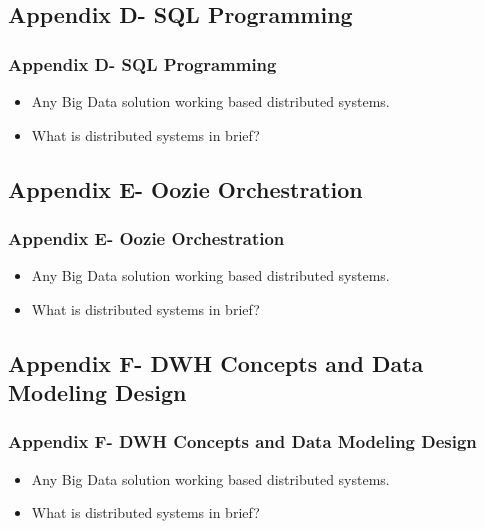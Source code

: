 
\subsection{Appendix D- SQL Programming}
\begin{frame}
\frametitle{Appendix D- SQL Programming}
\begin{itemize}[<+->]
	\item Any Big Data solution working based distributed systems.
	\item What is distributed systems in brief?
\end{itemize}
\end{frame}


\subsection{Appendix E- Oozie Orchestration}
\begin{frame}
\frametitle{Appendix E- Oozie Orchestration}
\begin{itemize}[<+->]
	\item Any Big Data solution working based distributed systems.
	\item What is distributed systems in brief?
\end{itemize}
\end{frame}


\subsection{Appendix F- DWH Concepts and Data Modeling Design}
\begin{frame}
\frametitle{Appendix F- DWH Concepts and Data Modeling Design}
\begin{itemize}[<+->]
	\item Any Big Data solution working based distributed systems.
	\item What is distributed systems in brief?
\end{itemize}
\end{frame}

